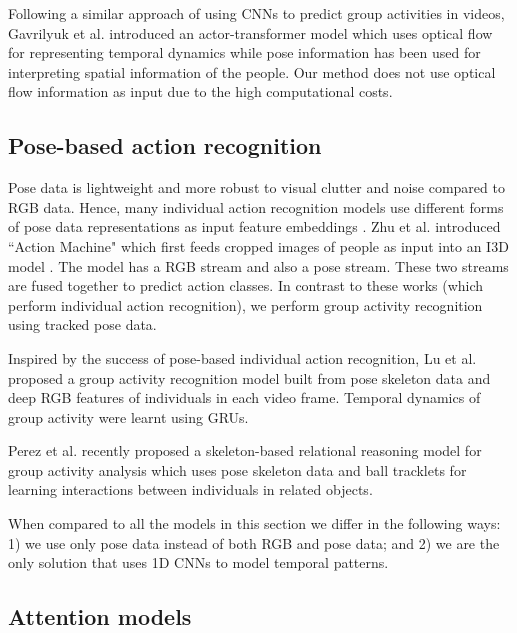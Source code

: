 \documentclass[a4paper,fleqn]{cas-dc}
\begin{document}
Following a similar approach of using CNNs to predict group activities in videos, Gavrilyuk et al.\cite{Gavrilyuk2020_ActorTransformer} introduced an actor-transformer model which uses optical flow for representing temporal dynamics while pose information has been used for interpreting spatial information of the people. 
Our method does not use optical flow information as input due to the high computational costs.


\subsection{Pose-based action recognition}
\label{ssec:pose-based-action-recognition}

Pose data is lightweight and more robust to visual clutter and  noise compared to RGB data. 
Hence, many individual action recognition models use different forms of pose data representations as input feature embeddings \cite{Liu2016_SpatioTemporalLW,Baradel2017_poseConditioned,Wang2017_modelingTemDynamics,Zhu2018_actionMachine}. 
Zhu et al. \cite{Zhu2018_actionMachine} introduced ``Action Machine" which first feeds cropped images of people as input into an I3D model \cite{Carreira2017_kinetics}. 
The model has a RGB stream and also a pose stream. 
These two streams are fused together to predict action classes. 
In contrast to these works (which perform individual action recognition), we perform group activity recognition using tracked pose data.

Inspired by the success of pose-based individual action recognition, Lu et al. \cite{Lu2019_spatioTempAtt} proposed a group activity recognition model built from pose skeleton data and deep RGB features of individuals in each video frame. 
Temporal dynamics of group activity were learnt using GRUs.

Perez et al.\cite{Perez2020_SkeletonBased_GIRN} recently proposed a skeleton-based relational reasoning model for group activity analysis which uses pose skeleton data and ball tracklets for learning interactions between individuals in related objects.

When compared to all the models in this section we differ in  the following ways: 1) we use only pose data instead of both  RGB and pose data; and 2) we are the only solution that uses  1D CNNs to model temporal patterns.

\subsection{Attention models}
\label{ssec:attention-models}
\end{document}
